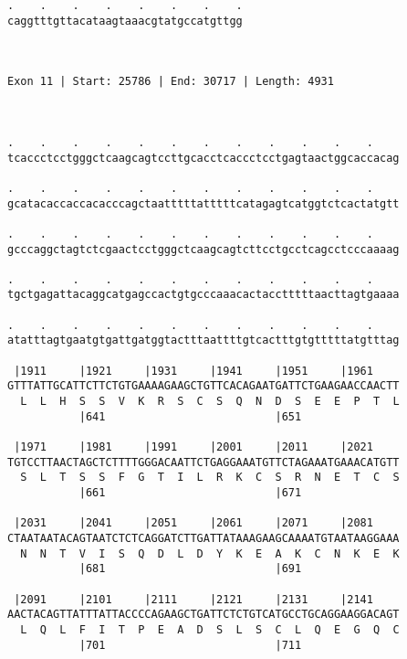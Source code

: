 \documentclass{article}
\begin{document}
\begin{Verbatim}
.    .    .    .    .    .    .    .
caggtttgttacataagtaaacgtatgccatgttgg
                                    
                                    
 
Exon 11 | Start: 25786 | End: 30717 | Length: 4931



.    .    .    .    .    .    .    .    .    .    .    .    
tcaccctcctgggctcaagcagtccttgcacctcaccctcctgagtaactggcaccacag
                                                            
.    .    .    .    .    .    .    .    .    .    .    .    
gcatacaccaccacacccagctaatttttatttttcatagagtcatggtctcactatgtt
                                                            
.    .    .    .    .    .    .    .    .    .    .    .    
gcccaggctagtctcgaactcctgggctcaagcagtcttcctgcctcagcctcccaaaag
                                                            
.    .    .    .    .    .    .    .    .    .    .    .    
tgctgagattacaggcatgagccactgtgcccaaacactacctttttaacttagtgaaaa
                                                            
.    .    .    .    .    .    .    .    .    .    .    .    
atatttagtgaatgtgattgatggtactttaattttgtcactttgtgtttttatgtttag
                                                            
 |1911     |1921     |1931     |1941     |1951     |1961    
GTTTATTGCATTCTTCTGTGAAAAGAAGCTGTTCACAGAATGATTCTGAAGAACCAACTT
  L  L  H  S  S  V  K  R  S  C  S  Q  N  D  S  E  E  P  T  L
           |641                          |651               
  
 |1971     |1981     |1991     |2001     |2011     |2021    
TGTCCTTAACTAGCTCTTTTGGGACAATTCTGAGGAAATGTTCTAGAAATGAAACATGTT
  S  L  T  S  S  F  G  T  I  L  R  K  C  S  R  N  E  T  C  S
           |661                          |671               
  
 |2031     |2041     |2051     |2061     |2071     |2081    
CTAATAATACAGTAATCTCTCAGGATCTTGATTATAAAGAAGCAAAATGTAATAAGGAAA
  N  N  T  V  I  S  Q  D  L  D  Y  K  E  A  K  C  N  K  E  K
           |681                          |691               
  
 |2091     |2101     |2111     |2121     |2131     |2141    
AACTACAGTTATTTATTACCCCAGAAGCTGATTCTCTGTCATGCCTGCAGGAAGGACAGT
  L  Q  L  F  I  T  P  E  A  D  S  L  S  C  L  Q  E  G  Q  C
           |701                          |711               
  

\end{Verbatim}
\end{document}
